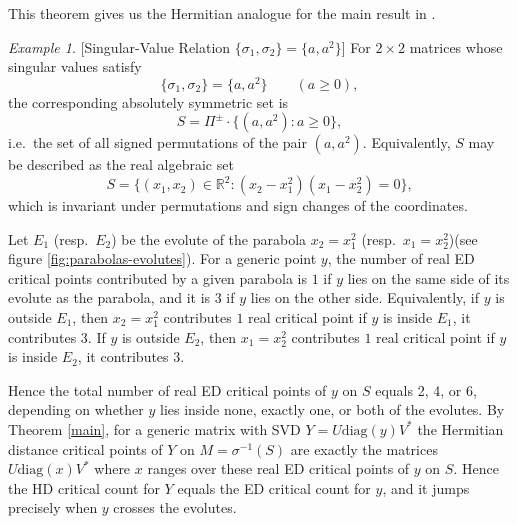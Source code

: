 \documentclass[11pt]{amsart}
\theoremstyle{plain}
\theoremstyle{definition}
\theoremstyle{remark}
\newtheorem{example}[theorem]{Example}
\begin{document}
This theorem gives us the Hermitian analogue for the main result in \cite{drusvyatskiy2017euclidean}.\\
\begin{example}\label{paras}[Singular-Value Relation \(\{\sigma_1,\sigma_2\} = \{a,a^2\}\)]
For \(2\times 2\) matrices whose singular values satisfy
\[
\{\sigma_1, \sigma_2\} = \{a, a^2\} \qquad (a \ge 0),
\]
the corresponding absolutely symmetric set is
\[
S = \Pi^{\pm} \cdot \{ (a, a^2) : a \ge 0 \},
\]
i.e.\ the set of all signed permutations of the pair \((a,a^2)\).  
Equivalently, \(S\) may be described as the real algebraic set
\[
S = \{ (x_1, x_2) \in \mathbb{R}^2 :
(x_2 - x_1^{2})(x_1 - x_2^{2}) = 0 \},
\]
which is invariant under permutations and sign changes of the coordinates. 

Let $E_1$ (resp.\ $E_2$) be the evolute of the parabola $x_2=x_1^2$ (resp.\ $x_1=x_2^2$)(see figure \ref{fig:parabolas-evolutes}).
For a generic point $y$, the number of real ED critical points contributed by a given parabola
is $1$ if $y$ lies on the same side of its evolute as the parabola, and it is $3$ if $y$ lies on the other side.
Equivalently,
if $y$ is outside $E_1$, then $x_2=x_1^2$ contributes $1$ real critical point if $y$ is inside $E_1$, it contributes $3$. If $y$ is outside $E_2$, then $x_1=x_2^2$ contributes $1$ real critical point if $y$ is inside $E_2$, it contributes $3$.

Hence the total number of real ED critical points of $y$ on $S$ equals 2, 4, or 6, depending on
whether $y$ lies inside none, exactly one, or both of the evolutes. By Theorem \ref{main}, for a generic matrix with SVD $Y=U\mathrm{diag}(y)V^*$ the Hermitian distance critical points of $Y$ on
$M=\sigma^{-1}(S)$ are exactly the matrices $U\mathrm{diag}(x)V^*$ where $x$ ranges over these real ED critical points of $y$ on $S$.
Hence the HD critical count for $Y$ equals the ED critical count for $y$, and it jumps precisely when $y$ crosses the evolutes.


\end{example}
\end{document}

